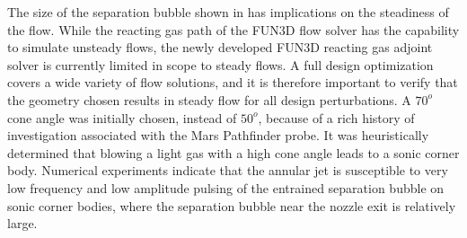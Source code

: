 The size of the separation bubble shown in  has
implications on the steadiness of the flow.  While the reacting gas path of the
FUN3D flow solver has the capability to simulate unsteady flows, the newly
developed FUN3D reacting gas adjoint solver is currently limited in scope to
steady flows.  A full design optimization covers a wide variety of flow
solutions, and it is therefore important to verify that the geometry chosen
results in steady flow for all design perturbations.  A $70^o$ cone angle was
initially chosen, instead of $50^o$, because of a rich history of investigation
associated with the Mars Pathfinder probe\cite{gnoffo1996influence}.  It was
heuristically determined that blowing a light gas with a high cone angle leads
to a sonic corner body.  Numerical experiments indicate that the annular jet is
susceptible to very low frequency and low amplitude pulsing of the entrained
separation bubble on sonic corner bodies, where the separation bubble near the
nozzle exit is relatively large.
